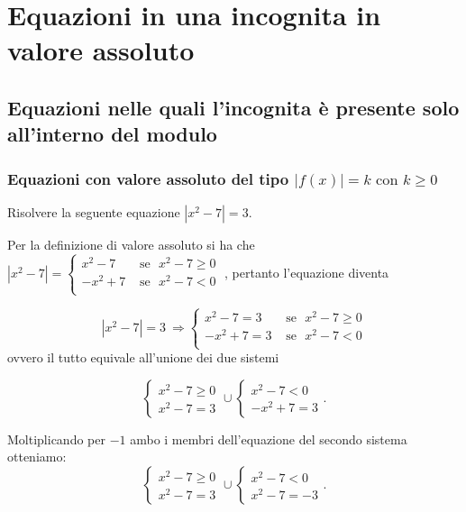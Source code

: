 \section{Equazioni in una incognita in valore assoluto}
\subsection{Equazioni nelle quali l'incognita è presente solo all'interno del modulo}

\subsubsection*{Equazioni con valore assoluto del tipo $\left|f(x)\right|=k\text{ con }k\ge 0$}

\begin{exrig}
\begin{esempio}\label{es:7.3}
Risolvere la seguente equazione $\left|x^2-7\right|=3$.

Per la definizione di valore assoluto si ha che
$\left|x^2-7\right|=\begin{cases}
x^2-7 & \text{ se~~}x^2-7 \ge 0\\
-x^2+7 & \text{ se~~}x^2-7 < 0\\
\end{cases}\;$, pertanto l'equazione diventa

\[\left|x^2-7\right|=3 \:\Rightarrow \begin{cases}
x^2-7=3 & \text{ se~~}x^2-7 \ge 0\\
-x^2+7=3 & \text{ se~~}x^2-7 < 0\\
\end{cases}\]
ovvero il tutto equivale all'unione dei due sistemi



\[\left\{\begin{array}{l}{x^2-7\ge 0}\\{x^2-7=3}\end{array}\right.\cup \left\{\begin{array}{l}{x^2-7<0}\\{-x^2+7=3}\end{array}\right..\]

Moltiplicando per $-1$ ambo i membri dell'equazione del secondo sistema otteniamo: \[\left\{\begin{array}{l}{x^2-7\ge 0}\\{x^2-7=3}\end{array}\right.\cup \left\{\begin{array}{l}{x^2-7<0}\\{x^2-7=-3}\end{array}\right..\]


\end{esempio}
\end{exrig}
